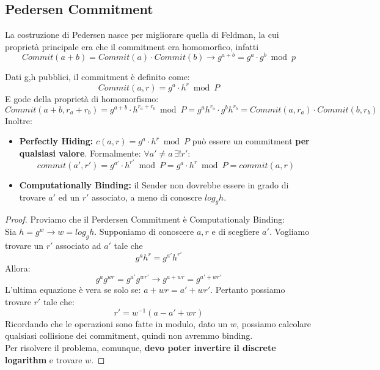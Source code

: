 \subsection{Pedersen Commitment}
La costruzione di Pedersen nasce per migliorare quella di Feldman, la cui proprietà principale era che il commitment era homomorfico, infatti 
\[Commit(a+b)=Commit(a)\cdot Commit(b)\rightarrow g^{a+b}=g^a\cdot g^b\bmod p\]
\begin{theorem}\label{thm:pedersen}
Dati g,h pubblici, il commitment è definito come:
\begin{equation}\label{eq:pedersen}
    Commit(a,r)=g^a\cdot h^r\bmod P
\end{equation}
E gode della proprietà di homomorfismo:
\[    Commit(a+b,r_a+r_b)=g^{a+b}\cdot h^{r_a+r_b}\bmod P=g^{a}h^{r_a}\cdot g^{b}h^{r_b}=Commit(a,r_a)\cdot Commit(b,r_b)
\]
Inoltre:
\begin{itemize}
    \item \textbf{Perfectly Hiding:} $c(a,r)=g^a\cdot h^r\bmod P$ può essere un commitment \textbf{per qualsiasi valore}. Formalmente: $\forall a'\ne a\,\exists !r':$ 
    \[commit(a',r')=g^{a'}\cdot h^{r'}\bmod P=g^a\cdot h^r\bmod P=commit(a,r)\]
    \item \textbf{Computationally Binding:} il Sender non dovrebbe essere in grado di trovare $a'$ ed un $r'$ associato, a meno di conoscre $log_g h$. 
\end{itemize}
\end{theorem}
\begin{proof}Proviamo che il Perdersen Commitment è Computationaly Binding:\\
Sia $h=g^w\rightarrow w=log_g h$. Supponiamo di conoscere $a,r$ e di scegliere $a'$. Vogliamo trovare un $r'$ associato ad $a'$ tale che
\begin{equation}\label{eq:proof}
    g^ah^r=g^{a'}h^{r'}
\end{equation}
Allora:
\begin{equation*}
    g^ag^{wr}=g^{a'}g^{wr'}\rightarrow     g^{a+wr}=g^{a'+wr'}
\end{equation*}
L'ultima equazione è vera se solo se: $a+wr=a'+wr'$. Pertanto possiamo trovare $r'$ tale che:
\[r'=w^{-1}(a-a'+wr)\]
Ricordando che le operazioni sono fatte in modulo, dato un $w$, possiamo calcolare qualsiasi collisione dei commitment, quindi non avremmo binding.\\
Per risolvere il problema, comunque, \textbf{devo poter invertire il discrete logarithm} e trovare $w$.
\end{proof}\pagebreak

